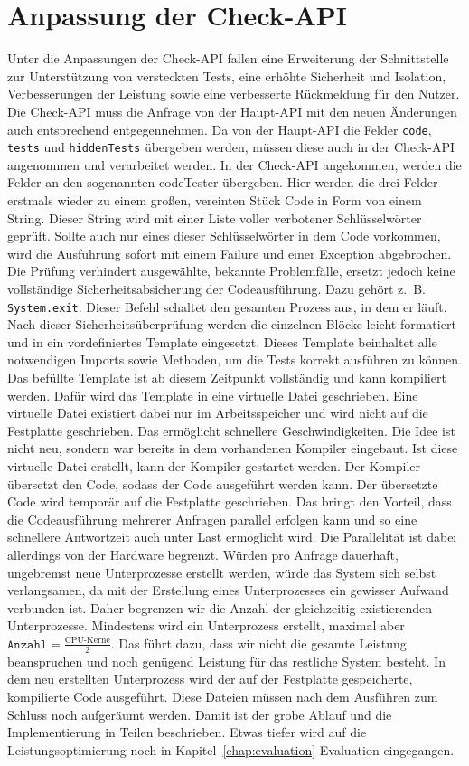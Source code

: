 \section{Anpassung der Check-API}
Unter die Anpassungen der Check-API fallen eine Erweiterung der Schnittstelle zur Unterstützung von versteckten Tests, eine erhöhte Sicherheit und Isolation, Verbesserungen der Leistung sowie eine verbesserte Rückmeldung für den Nutzer.
Die Check-API muss die Anfrage von der Haupt-API mit den neuen Änderungen auch entsprechend entgegennehmen. Da von der Haupt-API die Felder \texttt{code}, \texttt{tests} und \texttt{hiddenTests} übergeben werden, müssen diese auch in der Check-API angenommen und verarbeitet werden. In der Check-API angekommen, werden die Felder an den sogenannten codeTester übergeben. Hier werden die drei Felder erstmals wieder zu einem großen, vereinten Stück Code in Form von einem String. Dieser String wird mit einer Liste voller verbotener Schlüsselwörter geprüft. Sollte auch nur eines dieser Schlüsselwörter in dem Code vorkommen, wird die Ausführung sofort mit einem Failure und einer Exception abgebrochen. Die Prüfung verhindert ausgewählte, bekannte Problemfälle, ersetzt jedoch keine vollständige Sicherheitsabsicherung der Codeausführung. Dazu gehört z.~B. \texttt{System.exit}. Dieser Befehl schaltet den gesamten Prozess aus, in dem er läuft. Nach dieser Sicherheitsüberprüfung werden die einzelnen Blöcke leicht formatiert und in ein vordefiniertes Template eingesetzt. Dieses Template beinhaltet alle notwendigen Imports sowie Methoden, um die Tests korrekt ausführen zu können. Das befüllte Template ist ab diesem Zeitpunkt vollständig und kann kompiliert werden. Dafür wird das Template in eine virtuelle Datei geschrieben. Eine virtuelle Datei existiert dabei nur im Arbeitsspeicher und wird nicht auf die Festplatte geschrieben. Das ermöglicht schnellere Geschwindigkeiten. Die Idee ist nicht neu, sondern war bereits in dem vorhandenen Kompiler eingebaut. Ist diese virtuelle Datei erstellt, kann der Kompiler gestartet werden. Der Kompiler übersetzt den Code, sodass der Code ausgeführt werden kann. Der übersetzte Code wird temporär auf die Festplatte geschrieben. Das bringt den Vorteil, dass die Codeausführung mehrerer Anfragen parallel erfolgen kann und so eine schnellere Antwortzeit auch unter Last ermöglicht wird. Die Parallelität ist dabei allerdings von der Hardware begrenzt. Würden pro Anfrage dauerhaft, ungebremst neue Unterprozesse erstellt werden, würde das System sich selbst verlangsamen, da mit der Erstellung eines Unterprozesses ein gewisser Aufwand verbunden ist. Daher begrenzen wir die Anzahl der gleichzeitig existierenden Unterprozesse. Mindestens wird ein Unterprozess erstellt, maximal aber $\texttt{Anzahl} = \frac{\text{CPU-Kerne}}{2}$.
Das führt dazu, dass wir nicht die gesamte Leistung beanspruchen und noch genügend Leistung für das restliche System besteht.
In dem neu erstellten Unterprozess wird der auf der Festplatte gespeicherte, kompilierte Code ausgeführt. Diese Dateien müssen nach dem Ausführen zum Schluss noch aufgeräumt werden. Damit ist der grobe Ablauf und die Implementierung in Teilen beschrieben. Etwas tiefer wird auf die Leistungsoptimierung noch in Kapitel~\ref{chap:evaluation} Evaluation eingegangen.

